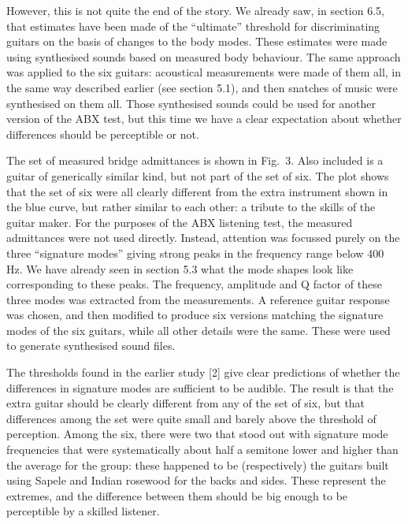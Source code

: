   However, this is not quite the end of the story. We already saw, in section 
  6.5, that estimates have been made of the “ultimate” threshold for 
  discriminating guitars on the basis of changes to the body modes. These 
  estimates were made using synthesised sounds based on measured body 
  behaviour. The same approach was applied to the six guitars: acoustical 
  measurements were made of them all, in the same way described earlier (see 
  section 5.1), and then snatches of music were synthesised on them all. Those 
  synthesised sounds could be used for another version of the ABX test, but 
  this time we have a clear expectation about whether differences should be 
  perceptible or not. 

  The set of measured bridge admittances is shown in Fig.\ 3. Also included is 
  a guitar of generically similar kind, but not part of the set of six. The 
  plot shows that the set of six were all clearly different from the extra 
  instrument shown in the blue curve, but rather similar to each other: a 
  tribute to the skills of the guitar maker. For the purposes of the ABX 
  listening test, the measured admittances were not used directly. Instead, 
  attention was focussed purely on the three “signature modes” giving strong 
  peaks in the frequency range below 400 Hz. We have already seen in section 
  5.3 what the mode shapes look like corresponding to these peaks. The 
  frequency, amplitude and Q factor of these three modes was extracted from the 
  measurements. A reference guitar response was chosen, and then modified to 
  produce six versions matching the signature modes of the six guitars, while 
  all other details were the same. These were used to generate synthesised 
  sound files. 


  The thresholds found in the earlier study [2] give clear predictions of 
  whether the differences in signature modes are sufficient to be audible. The 
  result is that the extra guitar should be clearly different from any of the 
  set of six, but that differences among the set were quite small and barely 
  above the threshold of perception. Among the six, there were two that stood 
  out with signature mode frequencies that were systematically about half a 
  semitone lower and higher than the average for the group: these happened to 
  be (respectively) the guitars built using Sapele and Indian rosewood for the 
  backs and sides. These represent the extremes, and the difference between 
  them should be big enough to be perceptible by a skilled listener. 

